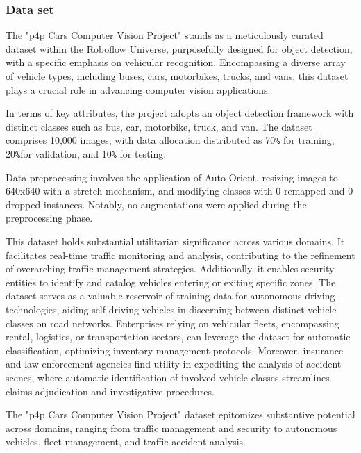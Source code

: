 \subsubsection{Data set}
\label{datset}
The "p4p Cars Computer Vision Project" stands as a meticulously curated dataset within the Roboflow Universe, purposefully designed for object detection, with a specific emphasis on vehicular recognition. Encompassing a diverse array of vehicle types, including buses, cars, motorbikes, trucks, and vans, this dataset plays a crucial role in advancing computer vision applications.

In terms of key attributes, the project adopts an object detection framework with distinct classes such as bus, car, motorbike, truck, and van. The dataset comprises 10,000 images, with data allocation distributed as 70\texttt{\%} for training, 20\texttt{\%}for validation, and 10\texttt{\%} for testing.

Data preprocessing involves the application of Auto-Orient, resizing images to 640x640 with a stretch mechanism, and modifying classes with 0 remapped and 0 dropped instances. Notably, no augmentations were applied during the preprocessing phase.

This dataset holds substantial utilitarian significance across various domains. It facilitates real-time traffic monitoring and analysis, contributing to the refinement of overarching traffic management strategies. Additionally, it enables security entities to identify and catalog vehicles entering or exiting specific zones. The dataset serves as a valuable reservoir of training data for autonomous driving technologies, aiding self-driving vehicles in discerning between distinct vehicle classes on road networks. Enterprises relying on vehicular fleets, encompassing rental, logistics, or transportation sectors, can leverage the dataset for automatic classification, optimizing inventory management protocols. Moreover, insurance and law enforcement agencies find utility in expediting the analysis of accident scenes, where automatic identification of involved vehicle classes streamlines claims adjudication and investigative procedures.

The "p4p Cars Computer Vision Project" dataset epitomizes substantive potential across domains, ranging from traffic management and security to autonomous vehicles, fleet management, and traffic accident analysis.\cite{p4p-cars_dataset}

